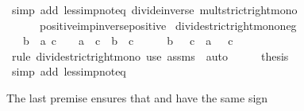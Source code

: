 \begin{isabellebody}
\ {\isacharparenleft}{\kern0pt}simp\ add{\isacharcolon}{\kern0pt}\ less{\isacharunderscore}{\kern0pt}imp{\isacharunderscore}{\kern0pt}not{\isacharunderscore}{\kern0pt}eq{}\ divide{\isacharunderscore}{\kern0pt}inverse\ mult{\isacharunderscore}{\kern0pt}strict{\isacharunderscore}{\kern0pt}right{\isacharunderscore}{\kern0pt}mono\isanewline
\ \ \ \ \ \ positive{\isacharunderscore}{\kern0pt}imp{\isacharunderscore}{\kern0pt}inverse{\isacharunderscore}{\kern0pt}positive{\isacharparenright}{\kern0pt}%
\endisatagproof
{\isafoldproof}%
%
\isadelimproof
\isanewline
%
\endisadelimproof
\isanewline
\isanewline
{}\isamarkupfalse%
\ divide{\isacharunderscore}{\kern0pt}strict{\isacharunderscore}{\kern0pt}right{\isacharunderscore}{\kern0pt}mono{\isacharunderscore}{\kern0pt}neg{\isacharcolon}{\kern0pt}\isanewline
\ \ \ {\isachardoublequoteopen}b\ {\isacharless}{\kern0pt}\ a{\isachardoublequoteclose}\ {\isachardoublequoteopen}c\ {\isacharless}{\kern0pt}\ {}{\isachardoublequoteclose}\ \ {\isachardoublequoteopen}a\ {\isacharslash}{\kern0pt}\ c\ {\isacharless}{\kern0pt}\ b\ {\isacharslash}{\kern0pt}\ c{\isachardoublequoteclose}\isanewline
%
\isadelimproof
%
\endisadelimproof
%
\isatagproof
{}\isamarkupfalse%
\ {\isacharminus}{\kern0pt}\isanewline
\ \ \isamarkupfalse%
\ {\isachardoublequoteopen}b\ {\isacharslash}{\kern0pt}\ {\isacharminus}{\kern0pt}\ c\ {\isacharless}{\kern0pt}\ a\ {\isacharslash}{\kern0pt}\ {\isacharminus}{\kern0pt}\ c{\isachardoublequoteclose}\isanewline
\ \ \ \ \isamarkupfalse%
\ {\isacharparenleft}{\kern0pt}rule\ divide{\isacharunderscore}{\kern0pt}strict{\isacharunderscore}{\kern0pt}right{\isacharunderscore}{\kern0pt}mono{\isacharparenright}{\kern0pt}\ {\isacharparenleft}{\kern0pt}use\ assms\ \ auto{\isacharparenright}{\kern0pt}\isanewline
\ \ \isamarkupfalse%
\ \isamarkupfalse%
\ {\isacharquery}{\kern0pt}thesis\isanewline
\ \ \ \ \isamarkupfalse%
\ {\isacharparenleft}{\kern0pt}simp\ add{\isacharcolon}{\kern0pt}\ less{\isacharunderscore}{\kern0pt}imp{\isacharunderscore}{\kern0pt}not{\isacharunderscore}{\kern0pt}eq{\isacharparenright}{\kern0pt}\isanewline
{}\isamarkupfalse%
%
\endisatagproof
{\isafoldproof}%
%
\isadelimproof
%
\endisadelimproof
%
\begin{isamarkuptext}%
The last premise ensures that  and 
      have the same sign%
\end{isamarkuptext}\isamarkuptrue%

\end{isabellebody}
